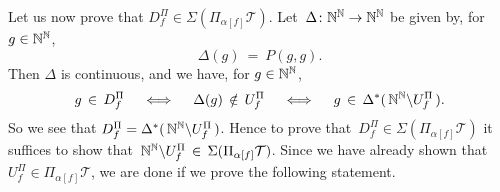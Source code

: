 \documentclass[main.tex]{subfiles}
\begin{document}
Let us now prove that $D^\Pi_f \in \Sigma (\Pi_{\alpha[f]}\mathcal{T})$.
Let~$\Delta\colon \mathbb{N}^{\mathbb{N}} \rightarrow \mathbb{N}^{\mathbb{N}}$
be given by, for $g\in \mathbb{N}^{\mathbb{N}}$,
\begin{equation*}
\Delta(g) \ =\  P(g,g).
\end{equation*}
Then $\Delta$ is continuous,
and we have, for $g\in \mathbb{N}^{\mathbb{N}}$,
\begin{equation*}
g\,\in\, D^\Pi_f 
\quad\iff\quad
\Delta(g) \,\notin\, U^\Pi_f
\quad\iff\quad
g\,\in\,\Delta^*(\,\mathbb{N}^{\mathbb{N}} \backslash U^\Pi_f \,).
\end{equation*}
So we see that $D^\Pi_f = \Delta^*(\,\mathbb{N}^{\mathbb{N}}\backslash U_f^\Pi\,)$.
Hence to prove that~$D^\Pi_f \in \Sigma(\Pi_{\alpha[f]}\mathcal{T})$
it suffices to show 
that~$\mathbb{N}^{\mathbb{N}}\backslash U^\Pi_f \,\in\, \Sigma(\Pi_{\alpha[f]}\mathcal{T})$.
Since we have already shown that~$U^\Pi_f \in \Pi_{\alpha[f]}\mathcal{T}$,
we are done if we prove the following statement.









































%
%
\end{document}
